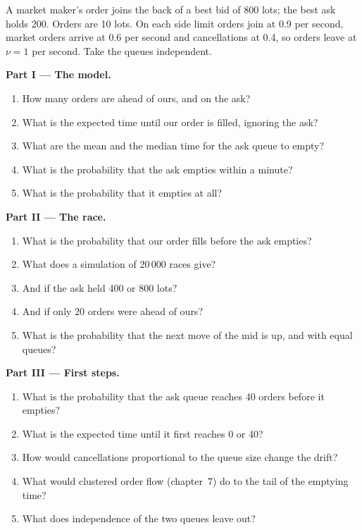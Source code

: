 \begin{problem}\label{pb:qm:markov-chains-and-queues:1}
A market maker's order joins the back of a best bid of 800 lots; the best ask holds 200. Orders are 10 lots.
On each side limit orders join at 0.9 per second, market orders arrive at 0.6 per second and cancellations at
0.4, so orders leave at $\nu = 1$ per second. Take the queues independent.

\medskip\noindent\textbf{Part I --- The model.}
\begin{enumerate}
\item How many orders are ahead of ours, and on the ask?
\item What is the expected time until our order is filled, ignoring the ask?
\item What are the mean and the median time for the ask queue to empty?
\item What is the probability that the ask empties within a minute?
\item What is the probability that it empties at all?
\end{enumerate}

\medskip\noindent\textbf{Part II --- The race.}
\begin{enumerate}[resume]
\item What is the probability that our order fills before the ask empties?
\item What does a simulation of 20\,000 races give?
\item And if the ask held 400 or 800 lots?
\item And if only 20 orders were ahead of ours?
\item What is the probability that the next move of the mid is up, and with equal queues?
\end{enumerate}

\medskip\noindent\textbf{Part III --- First steps.}
\begin{enumerate}[resume]
\item What is the probability that the ask queue reaches 40 orders before it empties?
\item What is the expected time until it first reaches 0 or 40?
\item How would cancellations proportional to the queue size change the drift?
\item What would clustered order flow (chapter~7) do to the tail of the emptying time?
\item What does independence of the two queues leave out?
\end{enumerate}


\end{problem}
